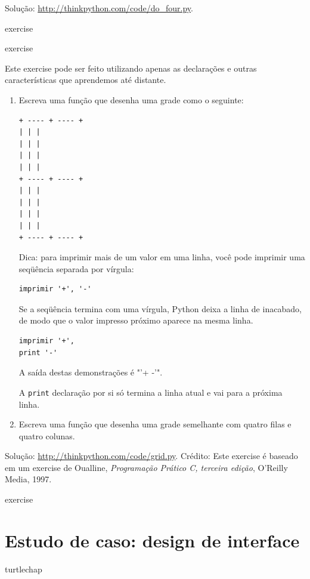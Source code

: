 \documentclass[10pt]{book}
\begin{document}
\begin{exercise}
\begin{}
Solução: \url{http://thinkpython.com/code/do_four.py}.

\end{} exercise



\begin{} exercise

Este exercise pode ser
feito utilizando apenas as declarações e outras características que aprendemos até
distante.  

\begin{enumerate}

\item Escreva uma função que desenha uma grade como o seguinte:

\begin{verbatim}
+ ---- + ---- +
| | |
| | |
| | |
| | |
+ ---- + ---- +
| | |
| | |
| | |
| | |
+ ---- + ---- +
\end{verbatim}
%
Dica: para imprimir mais de um valor em uma linha, você pode imprimir
uma seqüência separada por vírgula:

\begin{verbatim}
imprimir '+', '-'
\end{verbatim}
%
Se a seqüência termina com uma vírgula, Python deixa a linha de inacabado,
de modo que o valor impresso próximo aparece na mesma linha.

\begin{verbatim}
imprimir '+', 
print '-'
\end{verbatim}
%
A saída destas demonstrações é \verbo "'+ -'".

A {\tt print} declaração por si só termina a linha atual e
vai para a próxima linha.

\item Escreva uma função que desenha uma grade semelhante
com quatro filas e quatro colunas.

\end{enumerate}

Solução: \url{http://thinkpython.com/code/grid.py}.
Crédito: Este exercise é baseado em um exercise de Oualline, {\em
    Programação Prático C, terceira edição}, O'Reilly Media, 1997.

\end{} exercise





\chapter{Estudo de caso: design de interface}
\label{} turtlechap


\end{exercise}
\end{document}
